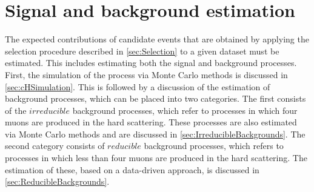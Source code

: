 \section{Signal and background estimation}
\label{sec:s+bEstimation}
The expected contributions of \cHZZ candidate events that are obtained by applying the selection procedure described in \autoref{sec:Selection} to a given dataset must be estimated. This includes estimating both the signal and background processes. First, the simulation of the \cHZZsen process via Monte Carlo methods is discussed in \autoref{sec:cHSimulation}. This is followed by a discussion of the estimation of background processes, which can be placed into two categories. The first consists of the $irreducible$ background processes, which refer to processes in which four muons are produced in the hard scattering. These processes are also estimated via Monte Carlo methods and are discussed in \autoref{sec:IrreducibleBackgrounds}. The second category consists of $reducible$ background processes, which refers to processes in which less than four muons are produced in the hard scattering. The estimation of these, based on a data-driven approach, is discussed in \autoref{sec:ReducibleBackgrounds}.


